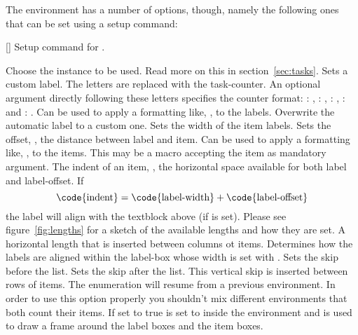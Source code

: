 \documentclass[load-preamble+]{cnltx-doc}
\begin{document}
The environment  has a number of options, though, namely the
following ones that can be set using a setup command:
\begin{commands}
  []
    Setup command for \Tasks.
\end{commands}
\begin{options}
  \Default
     Choose the instance to be used.  Read more on this in
     section~\ref{sec:tasks}.
    Sets a custom label.  The letters  are
    replaced with the task-counter.  An optional argument directly following
    these letters specifies the counter format: : ,
    : , : , :  and
    : .
  \Default
    Can be used to apply a formatting like, \eg,
     to the labels.
  \Default
    Overwrite the automatic label to a custom one.
  \Default{1em}
    Sets the width of the item labels.
  \Default{.3333em}
    Sets the offset, \ie, the distance between label and
    item.
  \Default
    Can be used to apply a formatting like, \eg,
     to the items. This may be a macro accepting the item as
    mandatory argument.
  \Default{2.5em}
    The indent of an item, \ie, the horizontal space
    available for both label and label-offset.  If
    \[
      \text{\code{indent}} =
      \text{\code{label-width}} + \text{\code{label-offset}}
    \]
    the label will align with the textblock above (if
     is set).  Please see figure~\ref{fig:lengths}
    for a sketch of the available lengths and how they are set.
  \Default{0pt}
    A horizontal length that is inserted between columns ot
    items.
    Determines how the labels are aligned within the
    label-box whose width is set with .
  \Default{0pt}
    Sets the skip before the list.
  \Default{0pt}
    Sets the skip after the list.
    This vertical skip is inserted between rows of items.
    The enumeration will resume from a previous  environment.  In
    order to use this option properly you shouldn't mix different 
    environments that both count their items.
    If set to true  is set to \code{0pt}
    inside the  environment and  is used to draw a frame
    around the label boxes and the item boxes.
\end{options}
\end{document}
